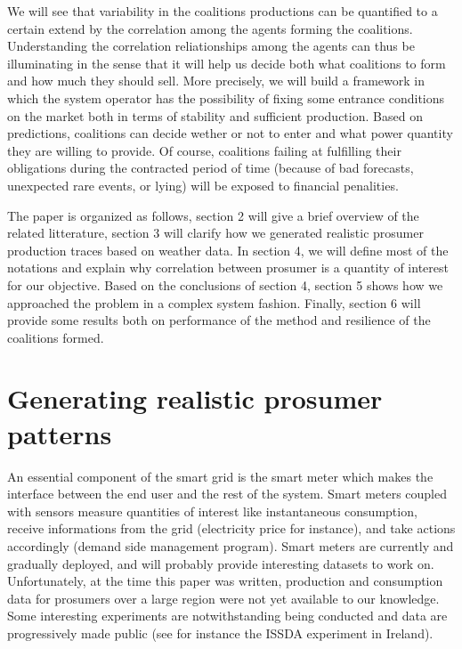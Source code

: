 \documentclass[conference]{IEEEtran}
\begin{document}
We will see that variability in the coalitions productions can be quantified to a certain extend by the correlation among the agents forming the coalitions. Understanding the correlation reliationships among the agents can thus be illuminating in the sense that it will help us decide both what coalitions to form and how much they should sell. More precisely, we will build a framework in which the system operator has the possibility of fixing some entrance conditions on the market both in terms of stability and sufficient production. Based on predictions, coalitions can decide wether or not to enter and what power quantity they are willing to provide. Of course, coalitions failing at fulfilling their obligations during the contracted period of time (because of bad forecasts, unexpected rare events, or lying) will be exposed to financial penalities.

The paper is organized as follows, section 2 will give a brief overview of the related litterature, section 3 will clarify how we generated realistic prosumer production traces based on weather data. In section 4, we will define most of the notations and explain why correlation between prosumer is a quantity of interest for our objective. Based on the conclusions of section 4, section 5 shows how we approached the problem in a complex system fashion. Finally, section 6 will provide some results both on performance of the method and resilience of the coalitions formed.


%
%

\section{Generating realistic prosumer patterns}
\label{sec:data}

An essential component of the smart grid is the smart meter which makes the interface between the end user and the rest of the system. Smart meters coupled with sensors measure quantities of interest like instantaneous consumption, receive informations from the grid (electricity price for instance), and take actions accordingly (demand side management program). Smart meters are currently and gradually deployed, and will probably provide interesting datasets to work on. Unfortunately, at the time this paper was written, production and consumption data for prosumers over a large region were not yet available to our knowledge. Some interesting experiments are notwithstanding being conducted and data are progressively made public (see for instance the ISSDA experiment in Ireland). 
\end{document}
